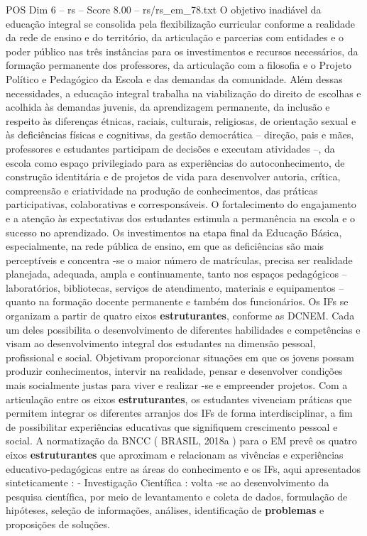 \begin{textsample}{POS Dim 6 – rs – Score 8.00 – rs/rs\_em\_78.txt}
O objetivo inadiável da educação integral se consolida pela flexibilização curricular conforme a realidade da rede de ensino e do território, da articulação e parcerias com entidades e o poder público nas três instâncias para os investimentos e recursos necessários, da formação permanente dos professores, da articulação com a filosofia e o Projeto Político e Pedagógico da Escola e das demandas da comunidade.
Além dessas necessidades, a educação integral trabalha na viabilização do direito de escolhas e acolhida às demandas juvenis, da aprendizagem permanente, da inclusão e respeito às diferenças étnicas, raciais, culturais, religiosas, de orientação sexual e às deficiências físicas e cognitivas, da gestão democrática – direção, pais e mães, professores e estudantes participam de decisões e executam atividades –, da escola como espaço privilegiado para as experiências do autoconhecimento, de construção identitária e de projetos de vida para desenvolver autoria, crítica, compreensão e criatividade na produção de conhecimentos, das práticas participativas, colaborativas e corresponsáveis.
O fortalecimento do engajamento e a atenção às expectativas dos estudantes estimula a permanência na escola e o sucesso no aprendizado.
Os investimentos na etapa final da Educação Básica, especialmente, na rede pública de ensino, em que as deficiências são mais perceptíveis e concentra -se o maior número de matrículas, precisa ser realidade planejada, adequada, ampla e continuamente, tanto nos espaços pedagógicos – laboratórios, bibliotecas, serviços de atendimento, materiais e equipamentos – quanto na formação docente permanente e também dos funcionários.
Os IFs se organizam a partir de quatro eixos \textbf{estruturantes}, conforme as DCNEM.
Cada um deles possibilita o desenvolvimento de diferentes habilidades e competências e visam ao desenvolvimento integral dos estudantes na dimensão pessoal, profissional e social.
Objetivam proporcionar situações em que os jovens possam produzir conhecimentos, intervir na realidade, pensar e desenvolver condições mais socialmente justas para viver e realizar -se e empreender projetos.
Com a articulação entre os eixos \textbf{estruturantes}, os estudantes vivenciam práticas que permitem integrar os diferentes arranjos dos IFs de forma interdisciplinar, a fim de possibilitar experiências educativas que signifiquem crescimento pessoal e social.
A normatização da BNCC ( BRASIL, 2018a ) para o EM prevê os quatro eixos \textbf{estruturantes} que aproximam e relacionam as vivências e experiências educativo-pedagógicas entre as áreas do conhecimento e os IFs, aqui apresentados sinteticamente : - Investigação Científica : volta -se ao desenvolvimento da pesquisa científica, por meio de levantamento e coleta de dados, formulação de hipóteses, seleção de informações, análises, identificação de \textbf{problemas} e proposições de soluções.

\end{textsample}
